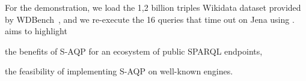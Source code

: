 %
%

For the demonstration, we load the 1,2 billion triples Wikidata dataset
provided by WDBench~\cite{angles2022wdbench}, and
we re-execute the 16 queries that time out on Jena using \NAME. %
%
\NAME aims to highlight
\begin{inparaenum}[(i)]
\item the benefits of S-AQP for an ecosystem of public SPARQL endpoints,
\item the feasibility of implementing S-AQP on well-known engines.
\end{inparaenum}


